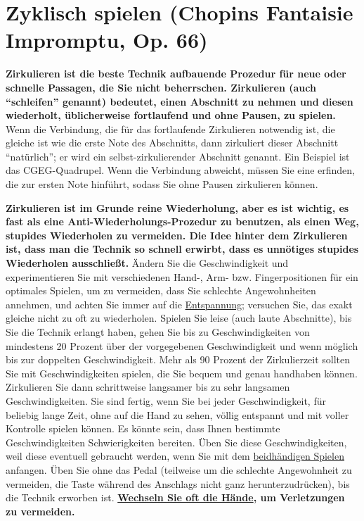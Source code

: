 
\section{Zyklisch spielen (Chopins Fantaisie Impromptu, Op. 66)}\hypertarget{c1iii2}{}

\textbf{Zirkulieren ist die beste Technik aufbauende Prozedur für neue oder schnelle Passagen, die Sie nicht beherrschen.
Zirkulieren (auch \enquote{schleifen} genannt) bedeutet, einen Abschnitt zu nehmen und diesen wiederholt, üblicherweise fortlaufend und ohne Pausen, zu spielen.}
Wenn die Verbindung, die für das fortlaufende Zirkulieren notwendig ist, die gleiche ist wie die erste Note des Abschnitts, dann zirkuliert dieser Abschnitt \enquote{natürlich}; er wird ein selbst-zirkulierender Abschnitt genannt.
Ein Beispiel ist das CGEG-Quadrupel.
Wenn die Verbindung abweicht, müssen Sie eine erfinden, die zur ersten Note hinführt, sodass Sie ohne Pausen zirkulieren können.

\textbf{Zirkulieren ist im Grunde reine Wiederholung, aber es ist wichtig, es fast als eine Anti-Wiederholungs-Prozedur zu benutzen, als einen Weg, stupides Wiederholen zu vermeiden.
Die Idee hinter dem Zirkulieren ist, dass man die Technik so schnell erwirbt, dass es unnötiges stupides Wiederholen ausschließt.}
Ändern Sie die Geschwindigkeit und experimentieren Sie mit verschiedenen Hand-, Arm- bzw. Fingerpositionen für ein optimales Spielen, um zu vermeiden, dass Sie schlechte Angewohnheiten annehmen, und achten Sie immer auf die \hyperlink{c1ii14}{Entspannung}; versuchen Sie, das exakt gleiche nicht zu oft zu wiederholen.
Spielen Sie leise (auch laute Abschnitte), bis Sie die Technik erlangt haben, gehen Sie bis zu Geschwindigkeiten von mindestens 20 Prozent über der vorgegebenen Geschwindigkeit und wenn möglich bis zur doppelten Geschwindigkeit.
Mehr als 90 Prozent der Zirkulierzeit sollten Sie mit Geschwindigkeiten spielen, die Sie bequem und genau handhaben können.
Zirkulieren Sie dann schrittweise langsamer bis zu sehr langsamen Geschwindigkeiten.
Sie sind fertig, wenn Sie bei jeder Geschwindigkeit, für beliebig lange Zeit, ohne auf die Hand zu sehen, völlig entspannt und mit voller Kontrolle spielen können.
Es könnte sein, dass Ihnen bestimmte Geschwindigkeiten Schwierigkeiten bereiten.
Üben Sie diese Geschwindigkeiten, weil diese eventuell gebraucht werden, wenn Sie mit dem \hyperlink{c1ii25}{beidhändigen Spielen} anfangen.
Üben Sie ohne das Pedal (teilweise um die schlechte Angewohnheit zu vermeiden, die Taste während des Anschlags nicht ganz herunterzudrücken), bis die Technik erworben ist.
\textbf{\hyperlink{c1ii7}{Wechseln Sie oft die Hände}, um Verletzungen zu vermeiden.}

